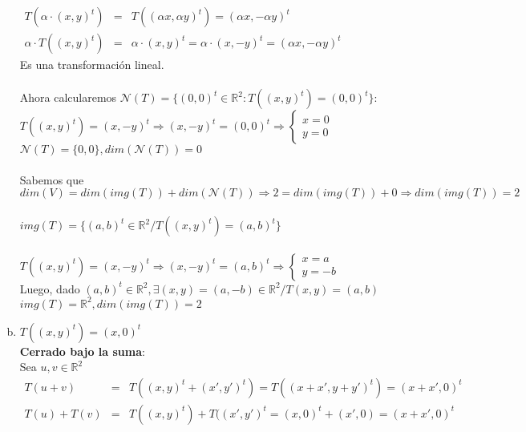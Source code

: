 \documentclass{article}
\begin{document}
\begin{enumerate}[a.]
		$
		\begin{array}{rlc}
		T(\alpha \cdot (x,y)^t) &=& T( (\alpha x, \alpha y)^t ) = (\alpha x, - \alpha y)^t \\
		\alpha \cdot T((x,y)^t) &=& \alpha \cdot (x,y)^t = \alpha \cdot (x,-y)^t = (\alpha x, -\alpha y)^t
		\end{array}
		$ \\
		Es una transformación lineal.
		\\ \\
		Ahora calcularemos $\mathcal{N}(T) = \{ (0,0)^t \in \mathbb{R}^2 : T((x,y)^t) = (0,0)^t \}$: \\
		$T((x,y)^t) = (x,-y)^t \Rightarrow (x,-y)^t = (0,0)^t \Rightarrow \begin{cases} x=0 \\ y=0 \end{cases}$
		\\
		$\mathcal{N}(T) = \{ 0,0 \}, dim(\mathcal{N}(T)) = 0$ \\
		\\
		Sabemos que $dim(V) = dim(img(T)) + dim(\mathcal{N}(T)) \Rightarrow 2 = dim(img(T)) + 0 \Rightarrow dim(img(T)) = 2$
		\\ \\
		$img(T) = \{ (a,b)^t \in \mathbb{R}^2 / T((x,y)^t) = (a,b)^t \}$ \\ \\
		$T((x,y)^t) = (x,-y)^t \Rightarrow (x,-y)^t = (a,b)^t \Rightarrow \begin{cases} x=a \\ y=-b \end{cases}$
		\\
		Luego, dado $(a,b)^t \in \mathbb{R}^2, \exists (x,y) = (a,-b) \in \mathbb{R}^2 / T(x,y) = (a,b)$ \\
		$img(T) = \mathbb{R}^2, dim(img(T)) = 2$
	\item
		$T((x,y)^t) = (x,0)^t$ \\
		\textbf{Cerrado bajo la suma}: \\
		Sea $u,v \in \mathbb{R}^2$ \\
		$
		\begin{array}{rlc}
		T(u+v) &=& T((x,y)^t+(x',y')^t) = T( (x+x',y+y')^t) = (x+x',0)^t \\
		T(u)+T(v) &=& T((x,y)^t) + T((x',y')^t = (x,0)^t + (x',0) = (x+x',0)^t
		\end{array}
		$
		

\end{enumerate}
\end{document}
